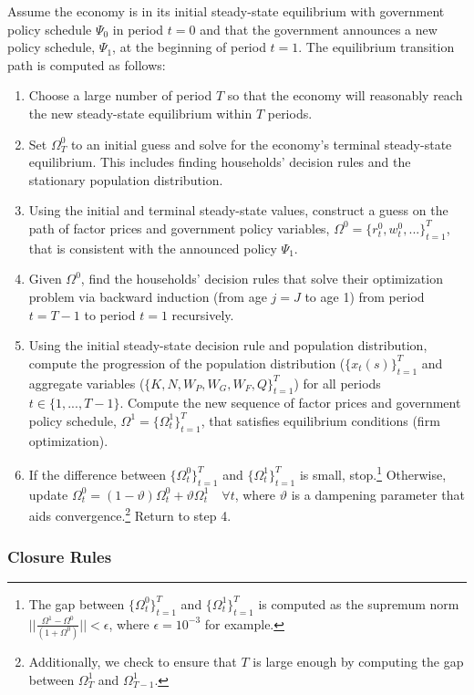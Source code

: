 \documentclass[11pt,leqno,fleqn]{article}
\begin{document}
Assume the economy is in its initial steady-state equilibrium with government policy schedule $\Psi_0$ in period $t=0$ and that the government announces a new policy schedule, $\Psi_1$, at the beginning of period $t=1$. The equilibrium transition path is computed as follows:
\begin{enumerate}
	\item Choose a large number of period $T$ so that the economy will reasonably reach the new steady-state equilibrium within $T$ periods.
	\item Set $\Omega_T^0$ to an initial guess and solve for the economy's terminal steady-state equilibrium. This includes finding households' decision rules and the stationary population distribution.
	\item Using the initial and terminal steady-state values, construct a guess on the path of factor prices and government policy variables, $\Omega^0 = \{r_t^0,w_t^0,...\}_{t=1}^T$, that is consistent with the announced policy $\Psi_1$.
	\item Given $\Omega^0$, find the households' decision rules that solve their optimization problem via backward induction (from age $j=J$ to age 1) from period $t=T-1$ to period $t=1$ recursively.
	\item Using the initial steady-state decision rule and population distribution, compute the progression of the population distribution ($\{x_t(s)\}_{t=1}^T$ and aggregate variables ($\{K,N,W_P,W_G,W_F,Q\}_{t=1}^T$) for all periods $t\in\{1,...,T-1\}$. Compute the new sequence of factor prices and government policy schedule, $\Omega^1 = \{\Omega_t^1\}_{t=1}^T$, that satisfies equilibrium conditions (firm optimization).
	\item If the difference between $\{\Omega_t^0\}_{t=1}^T$ and $\{\Omega_t^1\}_{t=1}^T$ is small, stop.\footnote{The gap between $\{\Omega_t^0\}_{t=1}^T$ and $\{\Omega_t^1\}_{t=1}^T$ is computed as the supremum norm $||\frac{\Omega^1 - \Omega^0}{(1+\Omega^0)}||<\epsilon$, where $\epsilon=10^{-3}$ for example.} Otherwise, update $\Omega_t^0 = (1-\vartheta)\Omega_t^0 + \vartheta \Omega_t^1 \quad \forall t$, where $\vartheta$ is a dampening parameter that aids convergence.\footnote{Additionally, we check to ensure that $T$ is large enough by computing the gap between $\Omega_T^1$ and $\Omega_{T-1}^1$.} Return to step 4.
\end{enumerate}

\subsubsection{Closure Rules}
\end{document}
